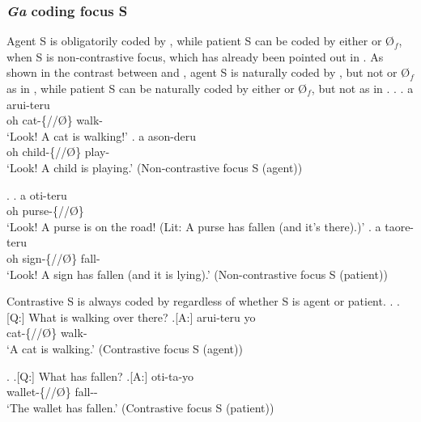 

\subsubsection{\textit{Ga} coding focus S}

Agent S is obligatorily coded by ,
while patient S can be coded by either  or {\O$_{f}$},
when S is non-contrastive focus,
which has already been pointed out in .
As shown in the contrast between \Next and \NNext,
agent S is naturally coded by ,
but not  or {\O$_{f}$} as in \Next,
while patient S can be naturally coded by either  or {\O$_{f}$},
but not  as in \NNext.
%
\ex.\label{ExAgentS}
	\ag. a  arui-teru \\
	oh cat-\{//\O\} walk- \\
	`Look! A cat is walking!'
	\bg. a  ason-deru \\
		oh child-\{//\O\} play- \\
		`Look! A child is playing.' \hfill{(Non-contrastive focus S (agent))}

\ex.\label{ExPatientS}
	\ag. a  oti-teru \\
		oh purse-\{//\O\} \\
		`Look! A purse is on the road! (Lit: A purse has fallen (and it's there).)'
	\bg. a  taore-teru \\
		oh sign-\{//\O\} fall- \\
		`Look! A sign has fallen (and it is lying).' \hfill{(Non-contrastive focus S (patient))}


Contrastive S is always coded by 
regardless of whether S is agent or patient.
%
\ex.
 \a.[Q:] What is walking over there?
 \bg.[A:]  arui-teru yo \\
	cat-\{//\O\} walk-  \\
	`A cat is walking.' \hfill{(Contrastive focus S (agent))}

\ex. \a.[Q:] What has fallen?
	\bg.[A:]  oti-ta-yo \\
			wallet-\{//\O\} fall-- \\
			`The wallet has fallen.' \hfill{(Contrastive focus S (patient))}

